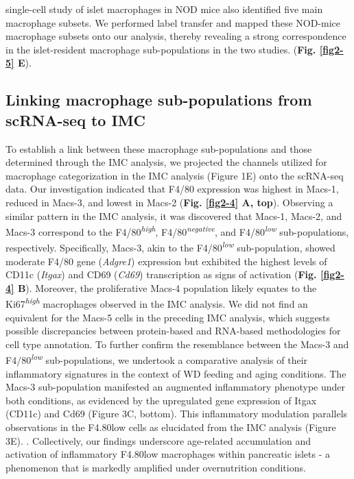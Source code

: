 single-cell study of islet macrophages in NOD mice also identified five main macrophage subsets. We performed label transfer and mapped these NOD-mice macrophage subsets onto our analysis, thereby revealing a strong correspondence in the islet-resident macrophage sub-populations in the two studies.  (\textbf{Fig. \ref{fig2-5} E}). 

\subsection{Linking macrophage sub-populations from scRNA-seq to IMC}
To establish a link between these macrophage sub-populations and those determined through the IMC analysis, we projected the channels utilized for macrophage categorization in the IMC analysis (Figure 1E) onto the scRNA-seq data. Our investigation indicated that F4/80 expression was highest in Macs-1, reduced in Macs-3, and lowest in Macs-2 (\textbf{Fig. \ref{fig2-4} A, top}). Observing a similar pattern in the IMC analysis, it was discovered that Macs-1, Macs-2, and Macs-3 correspond to the F4/80\textsuperscript{\textit{high}}, F4/80\textsuperscript{\textit{negative}}, and F4/80\textsuperscript{\textit{low}} sub-populations, respectively. Specifically, Macs-3, akin to the F4/80\textsuperscript{\textit{low}} sub-population, showed moderate F4/80 gene (\textit{Adgre1}) expression but exhibited the highest levels of CD11c (\textit{Itgax}) and CD69 (\textit{Cd69}) transcription as signs of activation (\textbf{Fig. \ref{fig2-4} B}). Moreover, the proliferative Macs-4 population likely equates to the Ki67\textsuperscript{\textit{high}} macrophages observed in the IMC analysis. We did not find an equivalent for the Macs-5 cells in the preceding IMC analysis, which suggests possible discrepancies between protein-based and RNA-based methodologies for cell type annotation. To further confirm the resemblance between the Macs-3 and F4/80\textsuperscript{\textit{low}} sub-populations, we undertook a comparative analysis of their inflammatory signatures in the context of WD feeding and aging conditions. The Macs-3 sub-population manifested an augmented inflammatory phenotype under both conditions, as evidenced by the upregulated gene expression of Itgax (CD11c) and Cd69 (Figure 3C, bottom). This inflammatory modulation parallels observations in the F4.80low cells as elucidated from the IMC analysis (Figure 3E).  . Collectively, our findings underscore age-related accumulation and activation of inflammatory F4.80low macrophages within pancreatic islets - a phenomenon that is markedly amplified under overnutrition conditions. 

